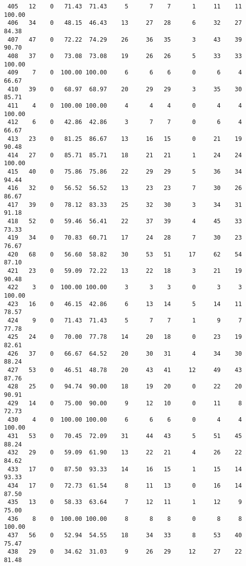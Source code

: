 \begin{verbatim}
 405   12    0   71.43  71.43     5      7    7      1     11    11   100.00
 406   34    0   48.15  46.43    13     27   28      6     32    27    84.38
 407   47    0   72.22  74.29    26     36   35      3     43    39    90.70
 408   37    0   73.08  73.08    19     26   26      5     33    33   100.00
 409    7    0  100.00 100.00     6      6    6      0      6     4    66.67
 410   39    0   68.97  68.97    20     29   29      3     35    30    85.71
 411    4    0  100.00 100.00     4      4    4      0      4     4   100.00
 412    6    0   42.86  42.86     3      7    7      0      6     4    66.67
 413   23    0   81.25  86.67    13     16   15      0     21    19    90.48
 414   27    0   85.71  85.71    18     21   21      1     24    24   100.00
 415   40    0   75.86  75.86    22     29   29      5     36    34    94.44
 416   32    0   56.52  56.52    13     23   23      7     30    26    86.67
 417   39    0   78.12  83.33    25     32   30      3     34    31    91.18
 418   52    0   59.46  56.41    22     37   39      4     45    33    73.33
 419   34    0   70.83  60.71    17     24   28      7     30    23    76.67
 420   68    0   56.60  58.82    30     53   51     17     62    54    87.10
 421   23    0   59.09  72.22    13     22   18      3     21    19    90.48
 422    3    0  100.00 100.00     3      3    3      0      3     3   100.00
 423   16    0   46.15  42.86     6     13   14      5     14    11    78.57
 424    9    0   71.43  71.43     5      7    7      1      9     7    77.78
 425   24    0   70.00  77.78    14     20   18      0     23    19    82.61
 426   37    0   66.67  64.52    20     30   31      4     34    30    88.24
 427   53    0   46.51  48.78    20     43   41     12     49    43    87.76
 428   25    0   94.74  90.00    18     19   20      0     22    20    90.91
 429   14    0   75.00  90.00     9     12   10      0     11     8    72.73
 430    4    0  100.00 100.00     6      6    6      0      4     4   100.00
 431   53    0   70.45  72.09    31     44   43      5     51    45    88.24
 432   29    0   59.09  61.90    13     22   21      4     26    22    84.62
 433   17    0   87.50  93.33    14     16   15      1     15    14    93.33
 434   17    0   72.73  61.54     8     11   13      0     16    14    87.50
 435   13    0   58.33  63.64     7     12   11      1     12     9    75.00
 436    8    0  100.00 100.00     8      8    8      0      8     8   100.00
 437   56    0   52.94  54.55    18     34   33      8     53    40    75.47
 438   29    0   34.62  31.03     9     26   29     12     27    22    81.48

\end{verbatim}
